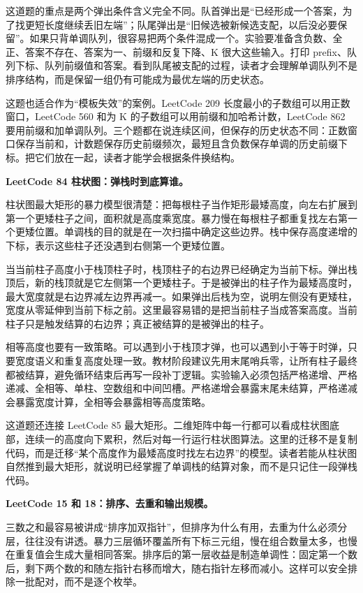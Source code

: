 这道题的重点是两个弹出条件含义完全不同。队首弹出是“已经形成一个答案，为了找更短长度继续丢旧左端”；队尾弹出是“旧候选被新候选支配，以后没必要保留”。如果只背单调队列，很容易把两个条件混成一个。实验要准备含负数、全正、答案不存在、答案为一、前缀和反复下降、K 很大这些输入。打印 prefix、队列下标、队列前缀值和答案。看到队尾被支配的过程，读者才会理解单调队列不是排序结构，而是保留一组仍有可能成为最优左端的历史状态。

这题也适合作为“模板失效”的案例。LeetCode 209 长度最小的子数组可以用正数窗口，LeetCode 560 和为 K 的子数组可以用前缀和加哈希计数，LeetCode 862 要用前缀和加单调队列。三个题都在说连续区间，但保存的历史状态不同：正数窗口保存当前和，计数题保存历史前缀频次，最短且含负数保存单调的历史前缀下标。把它们放在一起，读者才能学会根据条件换结构。

\noindent\textbf{LeetCode 84 柱状图：弹栈时到底算谁。}

柱状图最大矩形的暴力模型很清楚：把每根柱子当作矩形最矮高度，向左右扩展到第一个更矮柱子之间，面积就是高度乘宽度。暴力慢在每根柱子都重复找左右第一个更矮位置。单调栈的目的就是在一次扫描中确定这些边界。栈中保存高度递增的下标，表示这些柱子还没遇到右侧第一个更矮位置。

当当前柱子高度小于栈顶柱子时，栈顶柱子的右边界已经确定为当前下标。弹出栈顶后，新的栈顶就是它左侧第一个更矮柱子。于是被弹出的柱子作为最矮高度时，最大宽度就是右边界减左边界再减一。如果弹出后栈为空，说明左侧没有更矮柱，宽度从零延伸到当前下标之前。这里最容易错的是把当前柱子当成答案高度。当前柱子只是触发结算的右边界；真正被结算的是被弹出的柱子。

相等高度也要有一致策略。可以遇到小于栈顶才弹，也可以遇到小于等于时弹，只要宽度语义和重复高度处理一致。教材阶段建议先用末尾哨兵零，让所有柱子最终都被结算，避免循环结束后再写一段补丁逻辑。实验输入必须包括严格递增、严格递减、全相等、单柱、空数组和中间凹槽。严格递增会暴露末尾未结算，严格递减会暴露宽度计算，全相等会暴露相等高度策略。

这道题还连接 LeetCode 85 最大矩形。二维矩阵中每一行都可以看成柱状图底部，连续一的高度向下累积，然后对每一行运行柱状图算法。这里的迁移不是复制代码，而是迁移“某个高度作为最矮高度时找左右边界”的模型。读者若能从柱状图自然推到最大矩形，就说明已经掌握了单调栈的结算对象，而不是只记住一段弹栈代码。

\noindent\textbf{LeetCode 15 和 18：排序、去重和输出规模。}

三数之和最容易被讲成“排序加双指针”，但排序为什么有用，去重为什么必须分层，往往没有讲透。暴力三层循环覆盖所有下标三元组，慢在组合数量太多，也慢在重复值会生成大量相同答案。排序后的第一层收益是制造单调性：固定第一个数后，剩下两个数的和随左指针右移而增大，随右指针左移而减小。这样可以安全排除一批配对，而不是逐个枚举。

